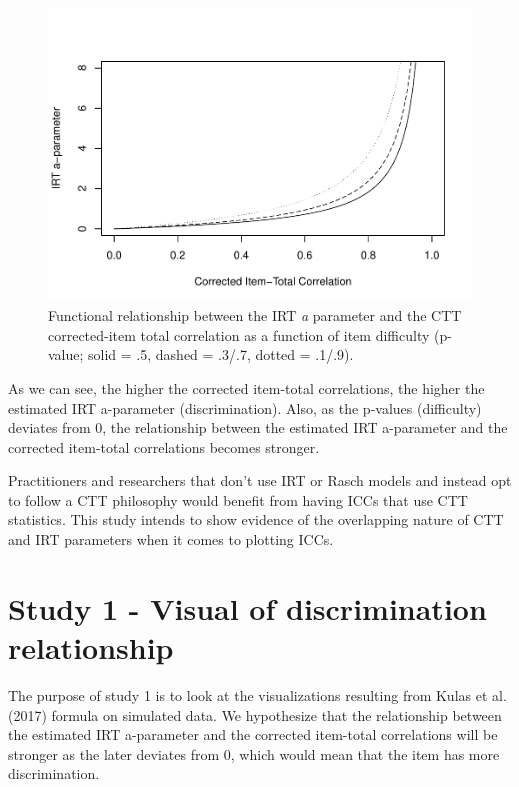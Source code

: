 \documentclass[
  english,
  man,floatsintext]{apa6}
\begin{document}
\begin{figure}
\centering
\includegraphics{ICC_project_files/figure-latex/acorrected-1.pdf}
\caption{\label{fig:acorrected}Functional relationship between the IRT \emph{a} parameter and the CTT corrected-item total correlation as a function of item difficulty (p-value; solid = .5, dashed = .3/.7, dotted = .1/.9).}
\end{figure}

As we can see, the higher the corrected item-total correlations, the higher the estimated IRT a-parameter (discrimination). Also, as the p-values (difficulty) deviates from 0, the relationship between the estimated IRT a-parameter and the corrected item-total correlations becomes stronger.

Practitioners and researchers that don't use IRT or Rasch models and instead opt to follow a CTT philosophy would benefit from having ICCs that use CTT statistics. This study intends to show evidence of the overlapping nature of CTT and IRT parameters when it comes to plotting ICCs.

\hypertarget{study-1---visual-of-discrimination-relationship}{%
\section{Study 1 - Visual of discrimination relationship}\label{study-1---visual-of-discrimination-relationship}}

The purpose of study 1 is to look at the visualizations resulting from Kulas et al. (2017) formula on simulated data. We hypothesize that the relationship between the estimated IRT a-parameter and the corrected item-total correlations will be stronger as the later deviates from 0, which would mean that the item has more discrimination.
\end{document}

